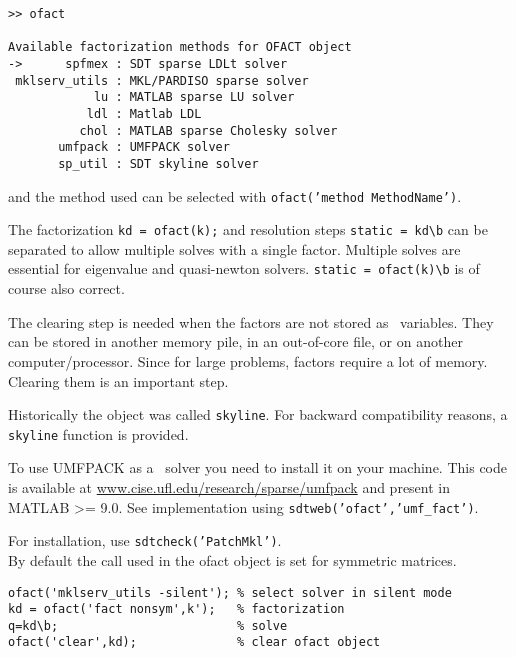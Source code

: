 \begin{verbatim}
>> ofact

Available factorization methods for OFACT object
->      spfmex : SDT sparse LDLt solver
 mklserv_utils : MKL/PARDISO sparse solver
            lu : MATLAB sparse LU solver
           ldl : Matlab LDL
          chol : MATLAB sparse Cholesky solver
       umfpack : UMFPACK solver
       sp_util : SDT skyline solver
\end{verbatim}

%
and the method used can be selected with {\tt ofact('method MethodName')}.

The factorization {\tt kd = ofact(k);} and resolution steps {\tt static = kd\verb+\+b} can be separated to allow multiple solves with a single factor. Multiple solves are essential for eigenvalue and quasi-newton solvers. {\tt static = ofact(k)\verb+\+b} is of course also correct.

The clearing step is needed when the factors are not stored as \matlab\ variables. They can be stored in another memory pile, in an out-of-core file, or on another computer/processor. Since for large problems, factors require a lot of memory. Clearing them is an important step.

Historically the object was called {\tt skyline}. For backward compatibility reasons, a {\tt skyline} function is provided.


To use UMFPACK as a \ofact\ solver you need to install it on your machine. This code is available at \href{http://www.cise.ufl.edu/research/sparse/umfpack}{www.cise.ufl.edu/research/sparse/umfpack} and present in MATLAB >= 9.0. See implementation using {\tt sdtweb('ofact','umf\_fact')}. 


For installation, use {\tt sdtcheck('PatchMkl')}.\\

By default the call used in the ofact object is set for symmetric matrices. 
\begin{verbatim}
ofact('mklserv_utils -silent'); % select solver in silent mode
kd = ofact('fact nonsym',k');   % factorization
q=kd\b;                         % solve
ofact('clear',kd);              % clear ofact object
\end{verbatim}

